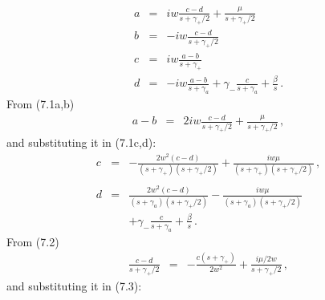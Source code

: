 \documentclass[twocolumn,aps,eqsecnum,showkeys,amsmath]{revtex4-2}
\begin{document}
%
\begin{subequations}
\begin{eqnarray} 	
a &=& i w\frac{c -d}{s +\gamma_+/2}  +\frac{\mu}{s +\gamma_+/2}  \\ 
b &=& -i w\frac{c -d}{s +\gamma_+/2}  	\\ 
c &=& i w \frac{a-b}{s +\gamma_+}   		\\ 
d &=& -i w \frac{a-b}{s +\gamma_a} +\gamma_- \frac{c}{s+ \gamma_a}  
	+ \frac{\beta}{s} \,.
\end{eqnarray} 
\end{subequations}
From (7.1a,b) 
%
\begin{eqnarray*} 	
a-b &=& 
	2 i w\frac{c -d}{s +\gamma_+/2}  +\frac{\mu}{s +\gamma_+/2} \,,
\end{eqnarray*} 
and substituting it in (7.1c,d):
%
\begin{eqnarray} 	
c &=& - \frac{2w^2 (c-d)}{ (s+\gamma_+) (s +\gamma_+/2) }   
	+\frac{i w \mu}{ (s+\gamma_+) (s +\gamma_+/2) } 	\,, 	
	\nonumber \\ \\
d &=& \frac{2w^2 (c-d)}{(s +\gamma_a)(s +\gamma_+/2)} 
	-\frac{i w \mu}{ (s+\gamma_a) (s +\gamma_+/2) } 	\nonumber \\
	&&+\gamma_- \frac{c}{s+ \gamma_a}  + \frac{\beta}{s} \,.
\end{eqnarray} 
From (7.2) 
%
\begin{eqnarray} 	
\frac{c-d}{ s +\gamma_+/2 } &=& -\frac{c(s+\gamma_+)}{2w^2}  
	+\frac{i \mu/2w}{s +\gamma_+/2} 	\,,  	
\end{eqnarray} 
and substituting it in (7.3): 
\end{document}
